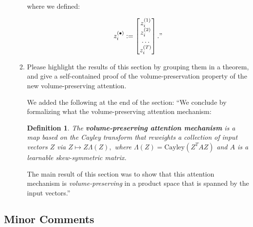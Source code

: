 \documentclass{article}
\newtheorem*{dfntn*}{Definition}
\begin{document}
\begin{enumerate}
\begin{enumerate}[label=\arabic*.]
{    where we defined:
    
    \begin{equation*}
        z_i^{(\bullet)} := \begin{bmatrix} z_i^{(1)} \\ z_i^{(2)} \\ \ldots \\ z_i^{(T)} \end{bmatrix}."
    \end{equation*}}


\item Please highlight the results of this section by grouping them in a theorem, and give a self-contained proof of the volume-preservation property of the new volume-preserving attention.

    {\color{mred} We added the following at the end of the section: ``We conclude by formalizing what the volume-preserving attention mechanism:

    \begin{dfntn*} The \textbf{volume-preserving attention mechanism} is a map based on the Cayley transform that reweights a collection of input vectors \(Z\) via \(Z \mapsto Z\Lambda(Z),\) where \(\Lambda(Z) = \mathrm{Cayley}(Z^TAZ)\) and \(A\) is a learnable skew-symmetric matrix.  \end{dfntn*}

    The main result of this section was to show that this attention mechanism is \emph{volume-preserving} in a product space that is spanned by the input vectors.''}
\end{enumerate}
\end{enumerate}
\subsection*{Minor Comments}
\end{document}
